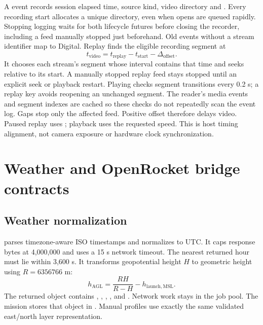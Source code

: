 A  event records session elapsed time, source kind,
video directory and . Every recording start allocates a unique
 directory, even when opens are queued rapidly.
Stopping logging waits for both lifecycle futures before closing the recorder,
including a feed manually stopped just beforehand. Old events without a stream
identifier map to Digital. Replay finds the eligible recording segment at
\[
 t_{\mathrm{video}}=t_{\mathrm{replay}}-t_{\mathrm{start}}-\Delta_{\mathrm{offset}}.
\]
It chooses each stream's segment whose interval contains that time and seeks
relative to its start. A manually stopped replay feed stays stopped until an
explicit seek or playback restart. Playing checks segment transitions every 0.2 s; a replay
key avoids reopening an unchanged segment. The reader's media events and
segment indexes are cached so these checks do not repeatedly scan the event log. Gaps stop only the affected feed. Positive offset therefore delays video. Paused replay uses
; playback uses the requested speed. This is host timing
alignment, not camera exposure or hardware clock synchronization.

\section{Weather and OpenRocket bridge contracts}\label{sec:bridge}
\subsection{Weather normalization}
 parses timezone-aware ISO timestamps and normalizes to
UTC. It caps response bytes at 4,000,000 and uses a 15 s network timeout. The
nearest returned hour must lie within 3,600 s. It transforms geopotential height
\(H\) to geometric height using \(R=6356766\) m:
\[
 h_{\mathrm{AGL}}=\frac{RH}{R-H}-h_{\mathrm{launch,MSL}}.
\]
The returned object contains , , ,
,  and . Network work stays in the
job pool. The mission stores that object in . Manual profiles
use exactly the same validated east/north layer representation.

